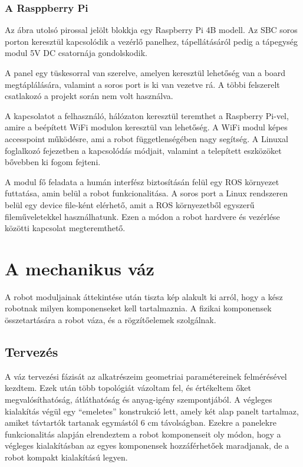 \subsubsection{A Rasppberry Pi}

Az ábra utolsó pirossal jelölt blokkja egy Raspberry Pi 4B modell. Az SBC soros
porton keresztül kapcsolódik a vezérlő panelhez, tápellátásáról pedig a tápegység
modul 5V DC csatornája gondolskodik.

A panel egy tüskesorral van szerelve, amelyen keresztül lehetőség van a board
megtáplálására, valamint a soros port is ki van vezetve rá. A többi felszerelt
csatlakozó a projekt során nem volt használva.

\medskip

A kapcsolatot a felhasználó, hálózaton keresztül teremthet a Raspberry Pi-vel,
amire a beépített WiFi modulon keresztül van lehetőség. A WiFi modul képes
accesspoint működésre, ami a robot függetlenségében nagy segítség. A Linuxal
foglalkozó fejezetben a kapcsolódás módjait, valamint a telepített eszközöket
bővebben ki fogom fejteni.

\medskip

A modul fő feladata a humán interfész biztosításán felül egy ROS környezet
futtatása, amin belül a robot funkcionalitása. A soros port a Linux rendszeren
belül egy device file-ként elérhető, amit a ROS környezetből egyszerű
fileműveletekkel használhatunk. Ezen a módon a robot hardvere és vezérlése
közötti kapcsolat megteremthető.\cite{rpisource}

\section{A mechanikus váz}

A robot moduljainak áttekintése után tiszta kép alakult ki arról, hogy a kész
robotnak milyen komponenseket kell tartalmaznia. A fizikai komponensek
összetartására a robot váza, és a rögzítőelemek szolgálnak. 

\subsection{Tervezés}

A váz tervezési fázisát az alkatrészeim geometriai paramétereinek felmérésével
kezdtem. Ezek után több topológiát vázoltam fel, és értékeltem őket
megvalósíthatóság, átláthatóság és anyag-igény szempontjából. A végleges
kialakítás végül egy ``emeletes'' konstrukció lett, amely két alap panelt
tartalmaz, amiket távtartók tartanak egymástól 6 cm távolságban. Ezekre a
panelekre funkcionalitás alapján elrendeztem a robot komponenseit oly módon, hogy
a végleges kialakításban az egyes komponensek hozzáférhetőek maradjanak, de a
robot kompakt kialakítású legyen.

